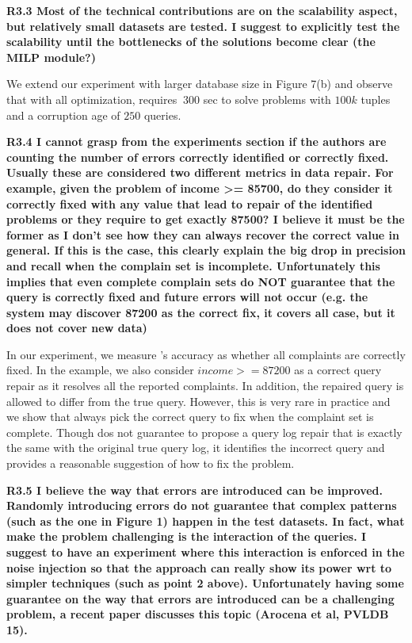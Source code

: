 \noindent \textbf{R3.3 Most of the technical contributions are on the scalability aspect, but relatively small datasets are tested. I suggest to explicitly test the scalability until the bottlenecks of the solutions become clear (the MILP module?)}

We extend our experiment with larger database size in Figure 7(b) and observe that with all optimization, \sys requires $~300$ sec to solve problems with $100k$ tuples and
a corruption age of $250$ queries. 

\noindent \textbf{R3.4 I cannot grasp from the experiments section if the authors are counting the number of errors correctly identified or correctly fixed. Usually these are considered two different metrics in data repair. For example, given the problem of income >= 85700, do they consider it correctly fixed with any value that lead to repair of the identified problems or they require to get exactly 87500? 
I believe it must be the former as I don't see how they can always recover the correct value in general. If this is the case, this clearly explain the big drop in precision and recall when the complain set is incomplete. Unfortunately this implies that even complete complain sets do NOT guarantee that the query is correctly fixed and future errors will not occur (e.g. the system may discover 87200 as the correct fix, it covers all case, but it does not cover new data)}

In our experiment, we measure \sys's accuracy as whether all complaints are correctly fixed. In the example, we also consider $income >= 87200$ as a correct query repair as it resolves all the reported complaints. In addition, the repaired query is allowed to differ from the true query. However, this is very rare in practice and we show that \sys always pick the correct query to fix when the complaint set is complete. Though \sys dos not guarantee to propose a query log repair that is exactly the same with the original true query log, it identifies the incorrect query and provides a reasonable suggestion of how to fix the problem. 

\noindent \textbf{R3.5 I believe the way that errors are introduced can be improved. Randomly introducing errors do not guarantee that complex patterns (such as the one in Figure 1) happen in the test datasets. In fact, what make the problem challenging is the interaction of the queries. I suggest to have an experiment where this interaction is enforced in the noise injection so that the approach can really show its power wrt to simpler techniques (such as point 2 above). 
Unfortunately having some guarantee on the way that errors are introduced can be a challenging problem, a recent paper discusses this topic (Arocena et al, PVLDB 15).}

